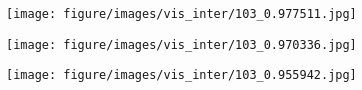 \begin{figure*}[t]
\begin{subfigure}[b]{.095\linewidth}
    \centering
    \texttt{[image: figure/images/vis\_inter/103\_0.977511.jpg]}
\end{subfigure} 
\begin{subfigure}[b]{.095\linewidth}
    \centering
    \texttt{[image: figure/images/vis\_inter/103\_0.970336.jpg]}
\end{subfigure} 
\begin{subfigure}[b]{.095\linewidth}
    \centering
    \texttt{[image: figure/images/vis\_inter/103\_0.955942.jpg]}
\end{subfigure} 

\end{figure*}
